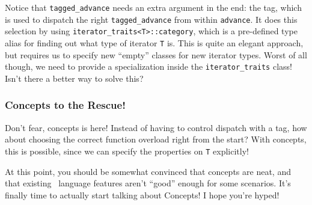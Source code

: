     

    \noindent Notice that \texttt{tagged\_advance} needs an extra argument in the end: the tag, which is used to dispatch the right \texttt{tagged\_advance} from within \texttt{advance}. It does this selection by using \texttt{iterator\_traits<T>::category}, which is a pre-defined type alias for finding out what type of iterator \texttt{T} is. This is quite an elegant approach, but requires us to specify new ``empty'' classes for new iterator types. Worst of all though, we need to provide a specialization inside the \texttt{iterator\_traits} class! Isn't there a better way to solve this?

    

    \subsubsection*{Concepts to the Rescue!}

    Don't fear, concepts is here! Instead of having to control dispatch with a tag, how about choosing the correct function overload right from the start? With concepts, this is possible, since we can specify the properties on \texttt{T} explicitly!

    

    \noindent At this point, you should be somewhat convinced that concepts are neat, and that existing \Cpp\ language features aren't ``good'' enough for some scenarios. It's finally time to actually start talking about Concepts! I hope you're hyped!
